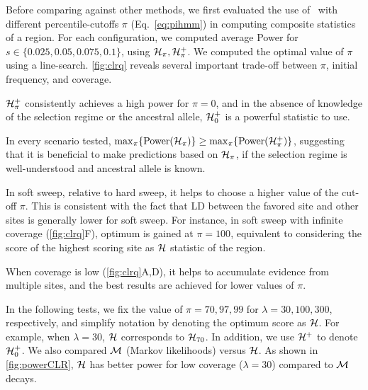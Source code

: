 Before comparing against other methods, we first evaluated the use of
\comale\ with different percentile-cutoffs $\pi$ (Eq.~\ref{eq:pihmm})
in computing composite statistics of a region. For each configuration,
we computed average Power for $s\in\{0.025,0.05,0.075,0.1\}$, using
${\cal H}_\pi,{\cal H}^{+}_\pi$. We computed the optimal value of $\pi$ using a
line-search. \ref{fig:clrq} reveals several important trade-off
between $\pi$, initial frequency, and coverage.
\begin{packed_itemize}
\item ${\cal H}^{+}_\pi$ consistently achieves a high power for $\pi=0$,
  and in the absence of knowledge of the selection regime or the
  ancestral allele, ${\cal H}^{+}_0$ is a powerful statistic to use.
\item In every scenario tested,
  $\max_{\pi}\{\mbox{Power}({\cal H}_\pi)\}\ge
  \max_{\pi}\{\mbox{Power}({\cal H}^{+}_\pi)\}$, suggesting that it is beneficial to 
  make predictions based on ${\cal H}_{\pi}$, if the
  selection regime is well-understood and ancestral allele is known.
\item In soft sweep, relative to hard sweep, it helps to choose a
  higher value of the cut-off $\pi$. This is consistent with the fact that LD
  between the favored site and other sites is generally lower for
  soft sweep. For instance, in soft sweep with infinite coverage
  (\ref{fig:clrq}F), optimum is gained at $\pi=100$, equivalent
  to considering the score of the highest scoring site as ${\cal H}$ statistic of 
  the region.
\item When coverage is low (\ref{fig:clrq}A,D), it helps to
  accumulate evidence from multiple sites, and the best results are
  achieved for lower values of $\pi$.
\end{packed_itemize}
In the following tests, we fix the value of $\pi=70,97, 99$ for
$\lambda=30,100,300$, respectively, and simplify notation by
denoting the optimum score as ${\cal H}$. For example, when $\lambda=30$,
${\cal H}$ corresponds to ${\cal H}_{70}$. In addition, we use ${\cal H}^{+}$ to
denote ${\cal H}^{+}_0$. We also compared ${\cal M}$ (Markov likelihoods) versus
${\cal H}$. As shown in \ref{fig:powerCLR}, ${\cal H}$ has better power for
low coverage ($\lambda=30$) compared to ${\cal M}$ decays.



